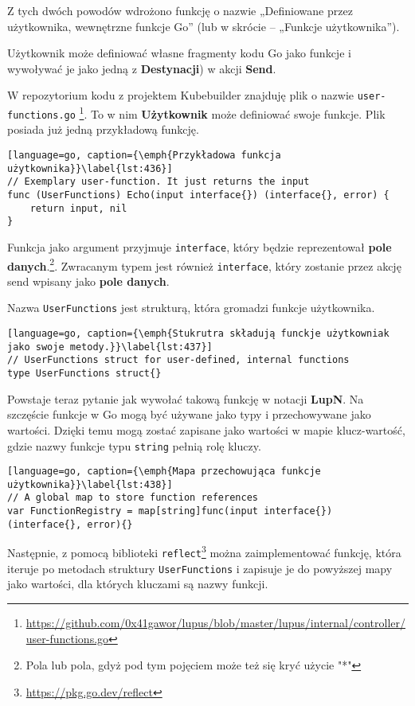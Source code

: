 Z tych dwóch powodów wdrożono funkcję o nazwie „Definiowane przez użytkownika, wewnętrzne funkcje Go” (lub w skrócie – „Funkcje użytkownika”).

Użytkownik może definiować własne fragmenty kodu Go jako funkcje i wywoływać je jako jedną z \textbf{Destynacji}) w akcji \textbf{Send}.

W repozytorium kodu z projektem Kubebuilder znajduję plik o nazwie \texttt{user-functions.go} \footnote{\url{https://github.com/0x41gawor/lupus/blob/master/lupus/internal/controller/user-functions.go}}. To w nim \textbf{Użytkownik} może definiować swoje funkcje. Plik posiada już jedną przykładową funkcję.

\begin{lstlisting}[language=go, caption={\emph{Przykładowa funkcja użytkownika}}\label{lst:436}]
// Exemplary user-function. It just returns the input
func (UserFunctions) Echo(input interface{}) (interface{}, error) {
	return input, nil
}
\end{lstlisting}

Funkcja jako argument przyjmuje \texttt{interface{}}, który będzie reprezentował \textbf{pole danych}.\footnote{Pola lub pola, gdyż pod tym pojęciem może też się kryć użycie "*"}. Zwracanym typem jest również \texttt{interface{}}, który zostanie przez akcję send wpisany jako \textbf{pole danych}.

Nazwa \texttt{UserFunctions} jest strukturą, która gromadzi funkcje użytkownika.

\begin{lstlisting}[language=go, caption={\emph{Stukrutra składują funckje użytkowniak jako swoje metody.}}\label{lst:437}]
// UserFunctions struct for user-defined, internal functions
type UserFunctions struct{}
\end{lstlisting}

Powstaje teraz pytanie jak wywołać takową funkcję w notacji \textbf{LupN}. Na szczęście funkcje w Go mogą być używane jako typy i przechowywane jako wartości. Dzięki temu mogą zostać zapisane jako wartości w mapie klucz-wartość, gdzie nazwy funkcje typu \texttt{string} pełnią rolę kluczy.


\begin{lstlisting}[language=go, caption={\emph{Mapa przechowująca funkcje użytkownika}}\label{lst:438}]
// A global map to store function references
var FunctionRegistry = map[string]func(input interface{}) (interface{}, error){}
\end{lstlisting}

Następnie, z pomocą biblioteki \texttt{reflect}\footnote{\url{https://pkg.go.dev/reflect}} można zaimplementować funkcję, która iteruje po metodach struktury \texttt{UserFunctions} i zapisuje je do powyższej mapy jako wartości, dla których kluczami są nazwy funkcji. 

